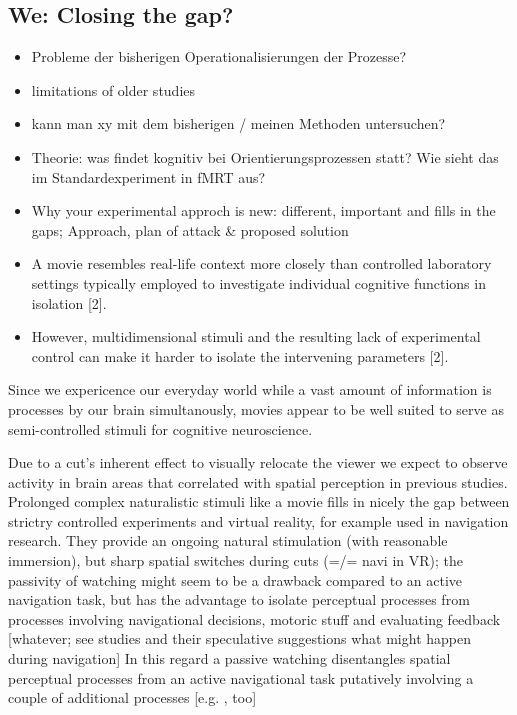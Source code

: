 \documentclass[10pt,a4paper,twocolumn]{article}
\begin{document}
\subsection*{We: Closing the gap?}
\begin{itemize}
	\item Probleme der bisherigen Operationalisierungen der Prozesse? 
	\item limitations of older studies
	\item kann man xy mit dem bisherigen / meinen Methoden untersuchen?
	\item Theorie: was findet kognitiv bei Orientierungsprozessen statt? Wie
	sieht das im Standardexperiment in fMRT aus?
	\item Why your experimental approch is new: different, important and fills
	in the gaps; Approach, plan of attack \& proposed solution
	\item A movie resembles real-life context more closely than controlled laboratory
	settings typically employed to investigate individual cognitive functions
	in isolation {[}2{]}\citep{labs_2015_portrayed_emos_in_Forrest}. 
	\item However, multidimensional stimuli and the resulting lack of experimental
	control can make it harder to isolate the intervening parameters {[}2{]}.
	\citep{labs_2015_portrayed_emos_in_Forrest}
\end{itemize}
Since we expericence our everyday world while a vast amount of information
is processes by our brain simultanously, movies appear to be well
suited to serve as semi-controlled stimuli for cognitive neuroscience. 

Due to a cut's inherent effect to visually relocate the viewer we
expect to observe activity in brain areas that correlated with spatial
perception in previous studies. Prolonged complex naturalistic stimuli
like a movie fills in nicely the gap between strictry controlled experiments
and virtual reality, for example used in navigation research. They
provide an ongoing natural stimulation (with reasonable immersion),
but sharp spatial switches during cuts (=/= navi in VR); the passivity
of watching might seem to be a drawback compared to an active navigation
task, but has the advantage to isolate perceptual processes from processes
involving navigational decisions, motoric stuff and evaluating feedback
{[}whatever; see studies and their speculative suggestions what might
happen during navigation{]} In this regard a passive watching disentangles
spatial perceptual processes from an active navigational task putatively
involving a couple of additional processes {[}e.g. \citep{chrastil_2013_framework_spatial_navi,taube_2013_navigation_in_VR},
too{]}
\end{document}
